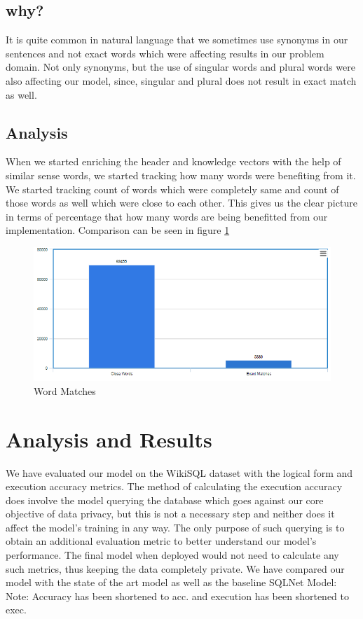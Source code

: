 \documentclass[12pt]{article}
\begin{document}
\subsection{why?}
It is quite common in natural language that we sometimes use synonyms in our sentences and not exact words which were affecting results in our problem domain. Not only synonyms, but the use of singular words and plural words were also affecting our model, since, singular and plural does not result in exact match as well. 

\subsection{Analysis}
When we started enriching the header and knowledge vectors with the help of similar sense words, we started tracking how many words were benefiting from it. We started tracking count of words which were completely same and count of those words as well which were close to each other. This gives us the clear picture in terms of percentage that how many words are being benefitted from our implementation. Comparison can be seen in figure \ref{WordMatches}

\begin{figure}[H]
    \includegraphics[width=450pt]{wordmatches}
	\caption{Word Matches}
    \label{WordMatches}
\end{figure}

\section{Analysis and Results}


We have evaluated our model on the WikiSQL dataset with
the logical form and execution accuracy metrics. The method
of calculating the execution accuracy does involve the model
querying the database which goes against our core objective of
data privacy, but this is not a necessary step and neither does
it affect the model’s training in any way. The only purpose of
such querying is to obtain an additional evaluation metric to
better understand our model’s performance. The final model
when deployed would not need to calculate any such metrics,
thus keeping the data completely private.
We have compared our model with the state of the art model
as well as the baseline SQLNet Model:
Note: Accuracy has been shortened to acc. and execution
has been shortened to exec.
\end{document}

